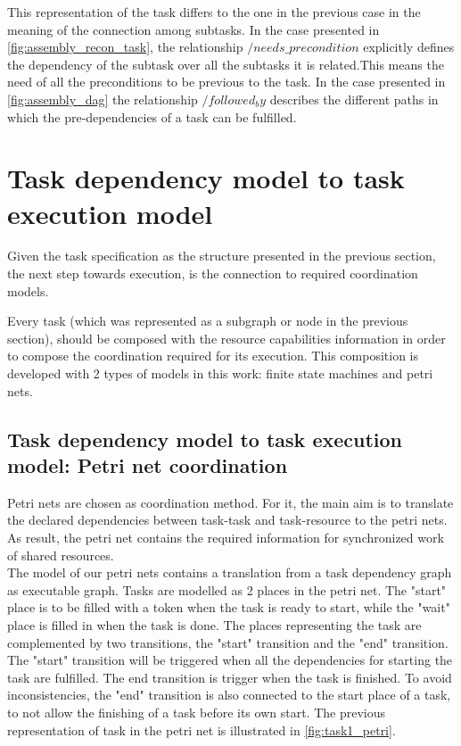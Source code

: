\documentclass[a4paper,10pt]{article}
\begin{document}
This representation of the task differs to the one in the previous case in the meaning of the connection among subtasks. In the case presented in \ref{fig:assembly_recon_task}, the relationship $/needs\_precondition$ explicitly defines the dependency of the subtask over all the subtasks it is related.This means the need of all the preconditions to be previous to the task. In the case presented  in \ref{fig:assembly_dag} the relationship $/followed_by$ describes the different paths in which the pre-dependencies of a task can be fulfilled.  








\section{Task dependency model to task execution model}

Given the task specification as the structure presented in the previous section, the next step towards execution, is the connection to required coordination models.

Every task (which was represented as a subgraph or node in the previous section), should be composed with the resource capabilities information in order to compose the coordination required for its execution. This composition is developed with 2 types of models in this work: finite state machines and petri nets.

\subsection{Task dependency model to task execution model: Petri net coordination}


Petri nets are chosen as coordination method. For it, the main aim is to translate the declared dependencies between task-task and task-resource to the petri nets. As result, the petri net contains the required information for synchronized work of shared resources.\\


The model of our petri nets contains a translation from a task dependency graph as executable graph. 
Tasks are modelled as 2 places in the petri net. The "start" place is to be filled with a token when the task is ready to start, while the "wait" place is filled in when the task is done.
The places representing the task are complemented by two transitions, the "start" transition and the "end" transition. The "start" transition will be triggered when all the dependencies for starting the task are fulfilled. The end transition is trigger when the task is finished. To avoid inconsistencies, the "end" transition is also connected to the start place of a task, to not allow the finishing of a task before its own start. 
The previous representation of task in the petri net is illustrated in \ref{fig:task1_petri}.
\end{document}
